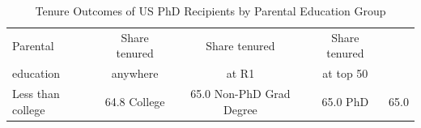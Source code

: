\begin{table}[htbp]\centering
\caption{Tenure Outcomes of US PhD Recipients by Parental Education Group}
\label{tab:descriptives}
\begin{tabular}{lccc} &&& \\ \hline
Parental & Share tenured & Share tenured & Share tenured \\
education & anywhere & at R1 & at top 50 \\ \hline
Less than college & 64.8%
College & 65.0%
Non-PhD Grad Degree & 65.0%
PhD & 65.0%
\bottomrule
\end{tabular}
\end{table}

